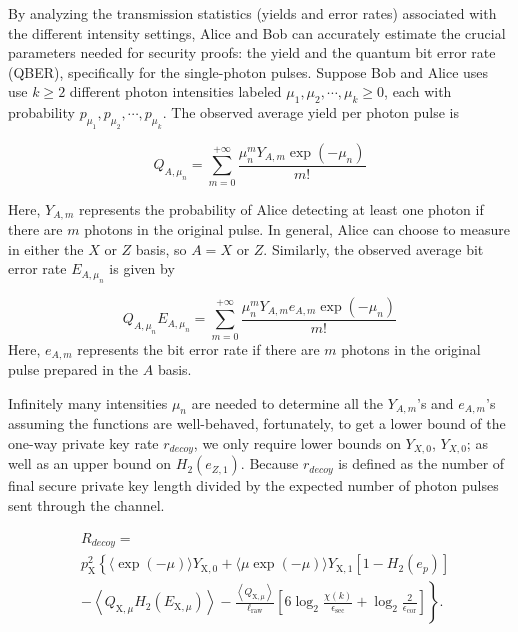 \documentclass[%
 reprint,
superscriptaddress,
 amsmath,amssymb,
 aps,
]{revtex4-2}
\begin{document}
By analyzing the transmission statistics (yields and error rates) associated with the different intensity settings, Alice and Bob can accurately estimate the crucial parameters needed for security proofs: the yield and the quantum bit error rate (QBER), specifically for the single-photon pulses. Suppose Bob and Alice uses use $k\ge2$ different photon intensities labeled $\mu_1, \mu_2, \cdots, \mu_k \ge 0$, each with probability $p_{\mu_1}, p_{\mu_2}, \cdots, p_{\mu_k}$. The observed average yield per photon pulse is

\begin{equation}
    Q_{A, \mu_n} = \sum_{m=0}^{+\infty}\frac{\mu_n^mY_{A, m}\exp{(-\mu_n)}}{m!}
\end{equation}

Here, $Y_{A, m}$ represents the probability of Alice detecting at least one photon if there are $m$ photons in the original pulse. In general, Alice can choose to measure in either the $X$ or $Z$ basis, so $A=X$ or $Z$. Similarly, the observed average bit error rate $E_{A,\mu_n}$ is given by

\begin{equation}
    Q_{A, \mu_n} E_{A, \mu_n} = \sum_{m=0}^{+\infty}\frac{\mu_n^mY_{A, m}e_{A, m}\exp{(-\mu_n)}}{m!}
\end{equation}
Here, $e_{A, m}$ represents the bit error rate if there are $m$ photons in the original pulse prepared in the $A$ basis.

Infinitely many intensities $\mu_n$ are needed to determine all the $Y_{A, m}$’s and $e_{A, m}$’s assuming the functions are well-behaved, fortunately, to get a lower bound of the one-way private key rate $r_{decoy}$, we only require lower bounds on $Y_{X, 0}$, $Y_{X, 0}$; as well as an upper bound on $H_2(e_{Z, 1})$. Because $r_{decoy}$ is defined as the number of final secure private key length divided by the expected number of photon pulses sent through the channel.

\begin{equation}
    \begin{aligned}
&R_{decoy}=\\
&p_{\mathrm{X}}^2\left\{\langle\exp (-\mu)\rangle Y_{\mathrm{X}, 0}+\langle\mu \exp (-\mu)\rangle Y_{\mathrm{X}, 1}\left[1-H_2\left(e_p\right)\right]\right. \\
& \left.-\left\langle Q_{\mathrm{X}, \mu} H_2\left(E_{\mathrm{X}, \mu}\right)\right\rangle-\frac{\left\langle Q_{\mathrm{X}, \mu}\right\rangle}{\ell_{\mathrm{raw}}}\left[6 \log _2 \frac{\chi(k)}{\epsilon_{\mathrm{sec}}}+\log _2 \frac{2}{\epsilon_{\mathrm{cor}}}\right]\right\} .
\end{aligned}
\end{equation}
\end{document}
